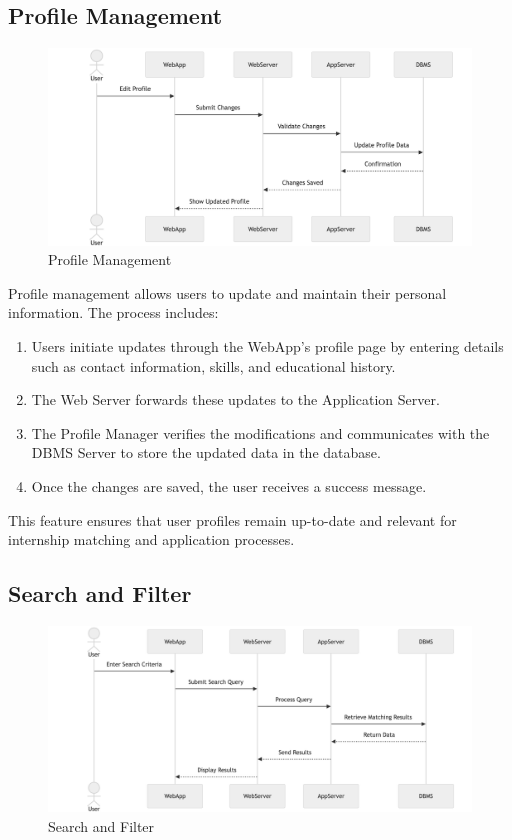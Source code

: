 \subsection{Profile Management}
\label{subsec:profile_management}
\begin{figure}[H]
    \begin{center}
        \includegraphics[width=0.82\linewidth]{JhaBhatiaSharma/imagesDD/ProfileManagement.png}
        \caption{Profile Management}
        \label{fig:profilemanagement}%
    \end{center}
\end{figure}

Profile management allows users to update and maintain their personal information. The process includes:
\begin{enumerate}
    \item Users initiate updates through the WebApp's profile page by entering details such as contact information, skills, and educational history.
    \item The Web Server forwards these updates to the Application Server.
    \item The Profile Manager verifies the modifications and communicates with the DBMS Server to store the updated data in the database.
    \item Once the changes are saved, the user receives a success message.
\end{enumerate}
This feature ensures that user profiles remain up-to-date and relevant for internship matching and application processes.

\subsection{Search and Filter}
\label{subsec:search_and_filter}

\begin{figure}[H]
    \begin{center}
        \includegraphics[width=0.82\linewidth]{JhaBhatiaSharma/imagesDD/SearchandFilter.png}
        \caption{Search and Filter}
        \label{fig:searchandfileter}%
    \end{center}
\end{figure}

